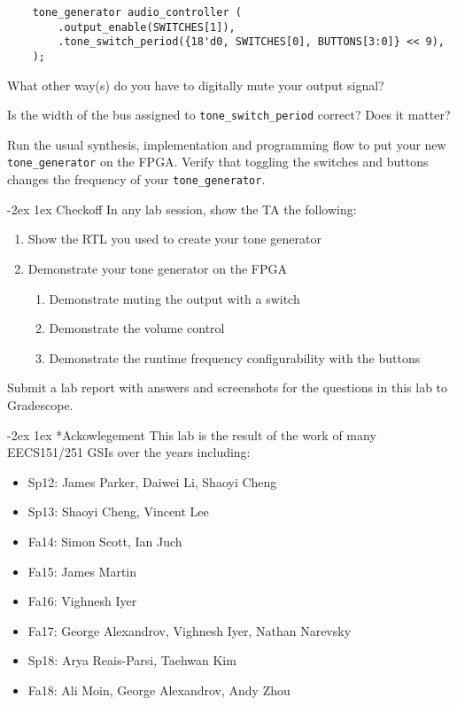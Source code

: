 \documentclass[11pt]{article}
\makeatletter
\renewcommand{\section}
{\@startsection {section}{1}{0pt}
 {-2ex}
 {1ex}
 {\bfseries\Large}}
\makeatother
\begin{document}
\begin{verbatim}
    tone_generator audio_controller (
        .output_enable(SWITCHES[1]),
        .tone_switch_period({18'd0, SWITCHES[0], BUTTONS[3:0]} << 9),
    );
\end{verbatim}

What other way(s) do you have to digitally mute your output signal?

Is the width of the bus assigned to \verb|tone_switch_period| correct? Does it matter?

Run the usual synthesis, implementation and programming flow to put your new \verb|tone_generator| on the FPGA. Verify that toggling the switches and buttons changes the frequency of your \verb|tone_generator|.

\section{Checkoff}
In any lab session, show the TA the following:
\begin{enumerate}
  \item Show the RTL you used to create your tone generator
  \item Demonstrate your tone generator on the FPGA
    \begin{enumerate}
      \item Demonstrate muting the output with a switch
      \item Demonstrate the volume control
      \item Demonstrate the runtime frequency configurability with the buttons
    \end{enumerate}
\end{enumerate}

Submit a lab report with answers and screenshots for the questions in this lab to Gradescope.

\section*{Ackowlegement}
This lab is the result of the work of many EECS151/251 GSIs over the years including:
\begin{itemize}
\item Sp12: James Parker, Daiwei Li, Shaoyi Cheng
\item Sp13: Shaoyi Cheng, Vincent Lee
\item Fa14: Simon Scott, Ian Juch
\item Fa15: James Martin
\item Fa16: Vighnesh Iyer
\item Fa17: George Alexandrov, Vighnesh Iyer, Nathan Narevsky
\item Sp18: Arya Reais-Parsi, Taehwan Kim
\item Fa18: Ali Moin, George Alexandrov, Andy Zhou
\end{itemize}
\end{document}
